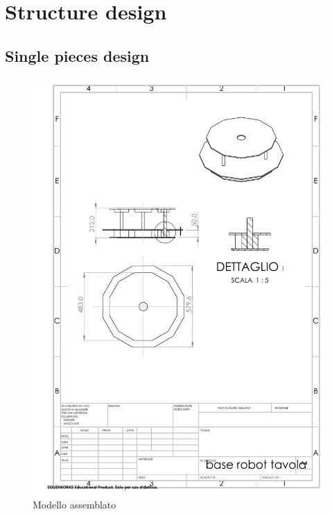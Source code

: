 \documentclass{article}
\begin{document}
\newpage
\section{Structure design} %
\subsection{Single pieces design}
\begin{figure}[H]
    \centering
    \includegraphics[width=.9\linewidth]{technical_drawings/base_robot_tavola.pdf}
    \caption{Modello assemblato}
    \label{fig:base_robot_tavola}
\end{figure}
\end{document}
